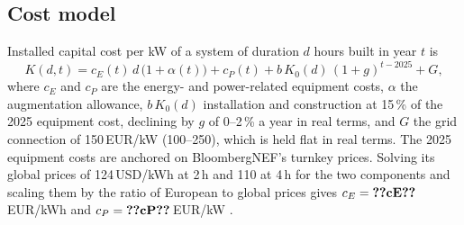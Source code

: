 \documentclass[11pt]{article}
\newcommand{\EUR}{EUR}
\begin{document}
\subsection{Cost model}\label{sec:cost}
Installed capital cost per kW of a system of duration $d$ hours built in year $t$ is
\begin{equation}\label{eq:capex}
K(d,t) = c_E(t)\,d\,\bigl(1+\alpha(t)\bigr) + c_P(t) + b\,K_0(d)\,(1+g)^{t-2025} + G,
\end{equation}
where $c_E$ and $c_P$ are the energy- and power-related equipment costs, $\alpha$ the augmentation allowance, $b\,K_0(d)$ installation and construction at 15\,\% of the 2025 equipment cost, declining by $g$ of 0--2\,\% a year in real terms, and $G$ the grid connection of 150\,\EUR/kW (100--250), which is held flat in real terms.
The 2025 equipment costs are anchored on BloombergNEF's turnkey prices. Solving its global prices of 124\,USD/kWh at 2\,h and 110 at 4\,h for the two components and scaling them by the ratio of European to global prices gives $c_E=\val{cE}$\,\EUR/kWh and $c_P=\val{cP}$\,\EUR/kW \citep{bnef2025ess}.
\end{document}
